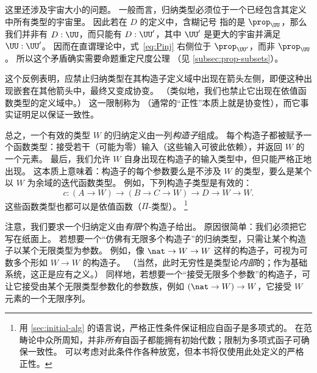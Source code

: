 \begin{rmk}
  这里还涉及宇宙大小的问题。
  一般而言，归纳类型必须位于一个已经包含其定义中所有类型的宇宙里。
  因此若在 $D$ 的定义中，含糊记号 \prop 指的是 $\prop_{\UU}$，那么我们并非有 $D:\UU$，而只能有 $D:\UU'$，其中 $\UU'$ 是更大的宇宙并满足 $\UU:\UU'$。
  因而在直谓理论中，式~\eqref{eq:Pinj} 右侧位于 $\prop_{\UU'}$，而非 $\prop_\UU$。
  所以这个矛盾确实需要命题重定尺度公理
  （见 \cref{subsec:prop-subsets}）。
\end{rmk}

%
这个反例表明，应禁止归纳类型在其构造子定义域中出现在箭头左侧，即便这种出现嵌套在其他箭头中，最终又变成协变。
（类似地，我们也禁止它出现在依值函数类型的定义域中。）
这一限制称为 
%
%
（通常的“正性”本质上就是协变性），而它事实证明足以保证一致性。

%
总之，一个有效的类型 $W$ 的归纳定义由一列\emph{构造子}组成。
每个构造子都被赋予一个函数类型：接受若干（可能为零）输入（这些输入可彼此依赖），并返回 $W$ 的一个元素。
最后，我们允许 $W$ 自身出现在构造子的输入类型中，但只能严格正地出现。
这本质上意味着：构造子的每个参数要么是不涉及 $W$ 的类型，要么是某个以 $W$ 为余域的迭代函数类型。
例如，下列构造子类型是有效的：
\begin{equation}
  c:(A\to W) \to (B\to C \to W) \to D \to W \to W.\label{eq:example-constructor}
\end{equation}
这些函数类型也都可以是依值函数（$\Pi$-类型）。%
\footnote{用 \cref{sec:initial-alg} 的语言说，严格正性条件保证相应自函子是多项式的。 在范畴论中众所周知，并非\emph{所有}自函子都能拥有初始代数；限制为多项式函子可确保一致性。
可以考虑对此条件作各种放宽，但本书将仅使用此处定义的严格正性。}

注意，我们要求一个归纳定义由\emph{有限}个构造子给出。
原因很简单：我们必须把它写在纸面上。
若想要一个“仿佛有无限多个构造子”的归纳类型，只需让某个构造子以某个无限类型为参数。
例如，像 $\nat \to W \to W$ 这样的构造子，可视为可数多个形如 $W\to W$ 的构造子。
（当然，此时无穷性是类型论\emph{内部}的；作为基础系统，这正是应有之义。）
同样地，若想要一个“接受无限多个参数”的构造子，可让它接受由某个无限类型参数化的参数族，例如 $(\nat\to W) \to W$，它接受 $W$ 元素的一个无限序列。

